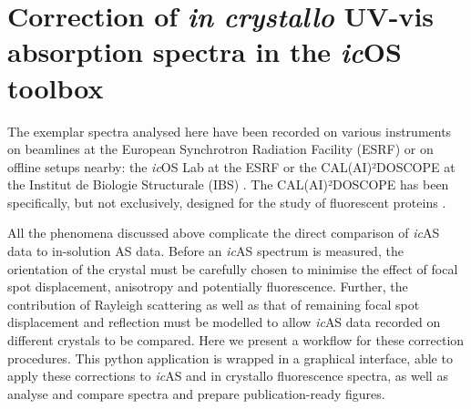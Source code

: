\section{Correction of \textit{in crystallo} UV-vis absorption spectra in the \textit{ic}OS toolbox}
The exemplar spectra analysed here have been recorded on various instruments on beamlines at the European Synchrotron Radiation Facility (ESRF) or on offline setups nearby: the \textit{ic}OS Lab at the ESRF \parencite{vonstettenCrystalloOpticalSpectroscopy2015} or the CAL(AI)²DOSCOPE at the Institut de Biologie Structurale (IBS) \parencite{byrdinCALAI2DOSCOPE2016}. The CAL(AI)²DOSCOPE has been specifically, but not exclusively, designed for the study of fluorescent proteins \parencite{dezitterMechanisticInvestigationMEos4b2019,dezitterMechanisticInvestigationsGreen2020}.


All the phenomena discussed above complicate the direct comparison of \textit{ic}AS data to in-solution AS data. Before an \textit{ic}AS spectrum is measured, the orientation of the crystal must be carefully chosen to minimise the effect of focal spot displacement, anisotropy and potentially fluorescence. Further, the contribution of Rayleigh scattering as well as that of remaining focal spot displacement and reflection must be modelled to allow \textit{ic}AS data recorded on different crystals to be compared. Here we present a workflow for these correction procedures. This python application is wrapped in a graphical interface, able to apply these corrections to \textit{ic}AS and in crystallo fluorescence spectra, as well as analyse and compare spectra and prepare publication-ready figures. 


